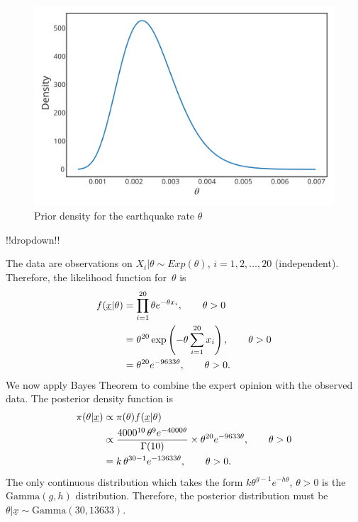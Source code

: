 {\begin{figure}[ht]
\includegraphics{images/priorplot4.svg}
\caption{Prior density for the earthquake rate $\theta$}
\label{fig:earthprior}

\end{figure}



!!dropdown!!

The data are observations on $X_i|\theta\sim Exp(\theta)$, $i=1,2,\ldots,20$ (independent). Therefore, the likelihood function for~$\theta$ is
    \begin{align}
    \label{eq:earthlik}
    f(\underline{x}|\theta)&=\prod_{i=1}^{20} \theta e^{-\theta x_i}, 
    \quad\quad\theta>0 \notag \\
    &=\theta^{20}\exp\left(-\theta\sum_{i=1}^{20} x_i\right),
    \quad\quad\theta>0 \notag \\
    &=\theta^{20} e^{-9633\theta},
    \quad\quad\theta>0. 
    \end{align}
    We now apply Bayes Theorem to combine the expert opinion with the observed data. The posterior density function is
    \begin{align}
    \label{eq:earthpost}
    \pi(\theta|\underline{x})&\propto\pi(\theta)f(\underline{x}|\theta) \notag \\
    &\propto\frac{4000^{10}\,\theta^{9}e^{-4000\theta}}{\Gamma(10)}\times
    \theta^{20} e^{-9633\theta},\quad\quad\theta>0 \notag  \\
    &=k\,\theta^{30-1}e^{-13633\theta},\quad\quad\theta>0.
    \end{align}
    The only continuous distribution which takes the form
    $k\theta^{g-1}e^{-h\theta}$, $\theta>0$ is the $\mathrm{Gamma}(g,h)$ distribution.
    Therefore, the posterior distribution must be $\theta|\underline{x}\sim
    \mathrm{Gamma}(30,13633)$.

}
